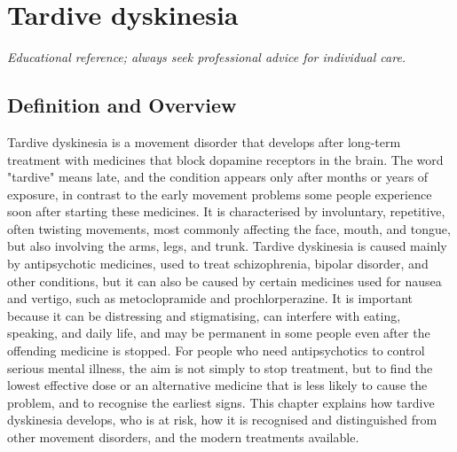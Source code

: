\chapter{Tardive dyskinesia}

\medskip
\noindent\textit{Educational reference; always seek professional advice for individual care.}

\section*{Definition and Overview}
Tardive dyskinesia is a movement disorder that develops after long-term treatment with medicines that block dopamine receptors in the brain. The word "tardive" means late, and the condition appears only after months or years of exposure, in contrast to the early movement problems some people experience soon after starting these medicines. It is characterised by involuntary, repetitive, often twisting movements, most commonly affecting the face, mouth, and tongue, but also involving the arms, legs, and trunk. Tardive dyskinesia is caused mainly by antipsychotic medicines, used to treat schizophrenia, bipolar disorder, and other conditions, but it can also be caused by certain medicines used for nausea and vertigo, such as metoclopramide and prochlorperazine. It is important because it can be distressing and stigmatising, can interfere with eating, speaking, and daily life, and may be permanent in some people even after the offending medicine is stopped. For people who need antipsychotics to control serious mental illness, the aim is not simply to stop treatment, but to find the lowest effective dose or an alternative medicine that is less likely to cause the problem, and to recognise the earliest signs. This chapter explains how tardive dyskinesia develops, who is at risk, how it is recognised and distinguished from other movement disorders, and the modern treatments available.

